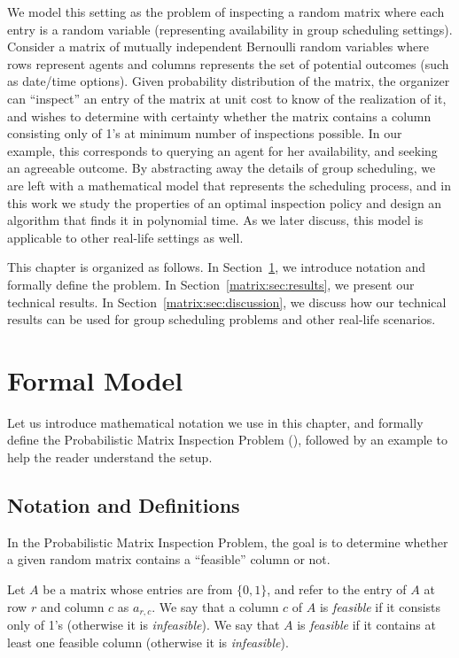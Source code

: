 We model this setting as the problem of inspecting a random matrix where each entry is a random variable (representing availability in group scheduling settings). 
Consider a matrix of mutually independent Bernoulli random variables where rows represent agents and columns represents the set of potential outcomes (such as date/time options). 
Given probability distribution of the matrix, the organizer can ``inspect'' an entry of the matrix at unit cost to know of the realization of it, and wishes to determine with certainty whether the matrix contains a column consisting only of 1's at minimum number of inspections possible. In our example, this corresponds to querying an agent for her availability, and seeking an agreeable outcome.
By abstracting away the details of group scheduling, we are left with a mathematical model that represents the scheduling process, and in this work we study the properties of an optimal inspection policy and design an algorithm that finds it in polynomial time. As we later discuss, this model is applicable to other real-life settings as well.

This chapter is organized as follows.
In Section~\ref{matrix:sec:model}, we introduce notation and formally define the problem. 
In Section~\ref{matrix:sec:results}, we present our technical results.
In Section~\ref{matrix:sec:discussion}, we discuss how our technical results can be used for group scheduling problems and other real-life scenarios. 





\section{Formal Model} \label{matrix:sec:model}

Let us introduce mathematical notation we use in this chapter, and formally define the Probabilistic Matrix Inspection Problem (\PMIP), followed by an example to help the reader understand the setup.


\subsection{Notation and Definitions}

In the Probabilistic Matrix Inspection Problem, the goal is to determine whether a given random matrix contains a ``feasible'' column or not. 

 \begin{definition}[Feasibility]
 Let $A$ be a matrix whose entries are from $\{0,1\}$, and refer to the entry of $A$ at row $r$ and column $c$ as $a_{r,c}$.
 We say that a column $c$ of $A$ is {\em feasible} if it consists only of 1's (otherwise it is {\em infeasible}). 
 We say that $A$ is {\em feasible} if it contains at least one feasible column (otherwise it is {\em infeasible}).
 \end{definition}

